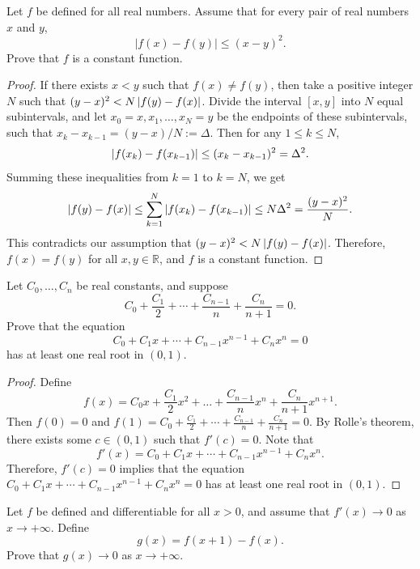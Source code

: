 \documentclass{article}
\begin{document}
\begin{problem}[5-1]
Let $f$ be defined for all real numbers. Assume that for every pair of real numbers $x$ and $y$,
\[
|f(x)-f(y)|\le (x-y)^2.
\]
Prove that $f$ is a constant function.
\end{problem}

\begin{proof}
  If there exists \( x< y \) such that \( f(x) \ne f(y) \), then take a positive integer \( N \) such that \( (y-x)^2<N\left|f(y)-f(x)\right| \). Divide the interval \( [x,y] \) into \( N \) equal subintervals, and let \( x_0=x, x_1, \ldots, x_N=y \) be the endpoints of these subintervals, such that \( x_{k}-x_{k-1}=(y-x)/N:=\Delta \). Then for any \( 1\le k\le N \), 
  \[ \left|f(x_{k})-f(x_{k-1})\right| \le (x_{k}-x_{k-1})^2 = \Delta^2. \]
  Summing these inequalities from $k=1$ to $k=N$, we get
  \[ \left|f(y)-f(x)\right| \le \sum_{k=1}^{N}\left|f(x_{k})-f(x_{k-1})\right| \le N\Delta^2 = \frac{(y-x)^2}{N}. \]
  This contradicts our assumption that $ (y-x)^2<N\left|f(y)-f(x)\right| $. Therefore, $ f(x) = f(y) $ for all $ x, y \in \mathbb{R} $, and $ f $ is a constant function.
\end{proof}



\begin{problem}[5-4]
Let $C_0,\ldots,C_n$ be real constants, and suppose
\[
C_0+\frac{C_1}{2}+\cdots+\frac{C_{n-1}}{n}+\frac{C_n}{n+1}=0.
\]
Prove that the equation
\[
C_0+C_1x+\cdots+C_{n-1}x^{n-1}+C_nx^n=0
\]
has at least one real root in $(0,1)$.
\end{problem}

\begin{proof}
  Define
  \[ f(x)=C_0x+\frac{C_1}{2}x^2+\dots+\frac{C_{n-1}}{n}x^n+\frac{C_n}{n+1}x^{n+1}. \]
  Then \( f(0)=0 \) and \( f(1)=C_0+\frac{C_1}{2}+\cdots+\frac{C_{n-1}}{n}+\frac{C_n}{n+1}=0 \). By Rolle's theorem, there exists some \( c\in (0,1) \) such that \( f'(c)=0 \). Note that
  \[ f'(x)=C_0+C_1x+\cdots+C_{n-1}x^{n-1}+C_nx^n. \]
  Therefore, \( f'(c)=0 \) implies that the equation \( C_0+C_1x+\cdots+C_{n-1}x^{n-1}+C_nx^n=0 \) has at least one real root in \( (0,1) \).
\end{proof}



\begin{problem}[5-5]
Let $f$ be defined and differentiable for all $x>0$, and assume that $f'(x)\to 0$ as $x\to +\infty$.
Define
\[
g(x)=f(x+1)-f(x).
\]
Prove that $g(x)\to 0$ as $x\to +\infty$.
\end{problem}
\end{document}
